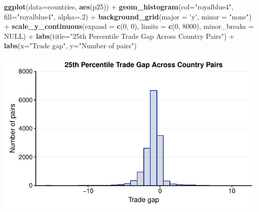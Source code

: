 \documentclass[10pt,]{article}
\newenvironment{Shaded}{\begin{snugshade}}{\end{snugshade}}
\newcommand{\KeywordTok}[1]{\textcolor[rgb]{0.13,0.29,0.53}{\textbf{{#1}}}}
\newcommand{\DataTypeTok}[1]{\textcolor[rgb]{0.13,0.29,0.53}{{#1}}}
\newcommand{\DecValTok}[1]{\textcolor[rgb]{0.00,0.00,0.81}{{#1}}}
\newcommand{\StringTok}[1]{\textcolor[rgb]{0.31,0.60,0.02}{{#1}}}
\newcommand{\OtherTok}[1]{\textcolor[rgb]{0.56,0.35,0.01}{{#1}}}
\newcommand{\NormalTok}[1]{{#1}}
\begin{document}
\begin{Shaded}
\begin{Highlighting}[]
\KeywordTok{ggplot}\NormalTok{(}\DataTypeTok{data=}\NormalTok{countries, }\KeywordTok{aes}\NormalTok{(p25)) +}
\StringTok{  }\KeywordTok{geom_histogram}\NormalTok{(}\DataTypeTok{col=}\StringTok{"royalblue4"}\NormalTok{,}
                 \DataTypeTok{fill=}\StringTok{"royalblue4"}\NormalTok{,}
                 \DataTypeTok{alpha=}\NormalTok{.}\DecValTok{2}\NormalTok{) +}
\StringTok{  }\KeywordTok{background_grid}\NormalTok{(}\DataTypeTok{major =} \StringTok{'y'}\NormalTok{, }\DataTypeTok{minor =} \StringTok{"none"}\NormalTok{) +}
\StringTok{  }\KeywordTok{scale_y_continuous}\NormalTok{(}\DataTypeTok{expand =} \KeywordTok{c}\NormalTok{(}\DecValTok{0}\NormalTok{, }\DecValTok{0}\NormalTok{), }\DataTypeTok{limits =} \KeywordTok{c}\NormalTok{(}\DecValTok{0}\NormalTok{, }\DecValTok{8000}\NormalTok{),  }\DataTypeTok{minor_breaks =} \OtherTok{NULL}\NormalTok{) +}
\StringTok{  }\KeywordTok{labs}\NormalTok{(}\DataTypeTok{title=}\StringTok{"25th Percentile Trade Gap Across Country Pairs"}\NormalTok{) +}
\StringTok{  }\KeywordTok{labs}\NormalTok{(}\DataTypeTok{x=}\StringTok{"Trade gap"}\NormalTok{, }\DataTypeTok{y=}\StringTok{"Number of pairs"}\NormalTok{)}
\end{Highlighting}
\end{Shaded}

\begin{center}\includegraphics{Figs/value_time-8} \end{center}
\end{document}
